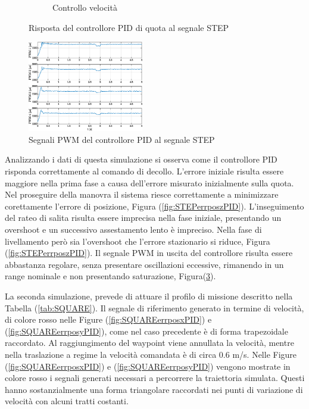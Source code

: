 \begin{figure}
\begin{subfigure}{0.45\textwidth}
		\caption{Controllo velocità}
		\label{fig:STEPerrvelzPID}
	\end{subfigure}
	\caption{Risposta del controllore PID di quota al segnale STEP}
\end{figure}

\begin{figure}
	\centering
	\includegraphics[width=0.45\textwidth]{Simulazioni/Figure/PID/STEP/PWM}
	\caption{Segnali PWM del controllore PID al segnale STEP}
	\label{fig:STEPerrPWMPID}
\end{figure}

Analizzando i dati di questa simulazione si osserva come il controllore PID risponda correttamente al comando di decollo. L'errore iniziale risulta essere maggiore nella prima fase a causa dell'errore misurato inizialmente sulla quota. Nel proseguire della manovra il sistema riesce correttamente a minimizzare corettamente l'errore di posizione, Figura (\ref{fig:STEPerrposzPID}). L'inseguimento del rateo di salita risulta essere imprecisa nella fase iniziale, presentando un overshoot e un successivo assestamento lento è impreciso. Nella fase di livellamento però sia l'overshoot che l'errore stazionario si riduce, Figura (\ref{fig:STEPerrposzPID}). Il segnale PWM in uscita del controllore risulta essere abbastanza regolare, senza presentare oscillazioni eccessive, rimanendo in un range nominale e non presentando saturazione, Figura(\ref{fig:STEPerrPWMPID}).

La seconda simulazione, prevede di attuare il profilo di missione descritto nella Tabella (\ref{tab:SQUARE}). Il segnale di riferimento generato in termine di velocità, di colore rosso nelle Figure (\ref{fig:SQUAREerrposxPID}) e (\ref{fig:SQUAREerrposyPID}), come nel caso precedente è di forma trapezoidale raccordato. Al raggiungimento del waypoint viene annullata la velocità, mentre nella traslazione a regime la velocità comandata è di circa  0.6 m/s. Nelle Figure (\ref{fig:SQUAREerrposxPID}) e (\ref{fig:SQUAREerrposyPID}) vengono mostrate in colore rosso i segnali generati necessari a percorrere la traiettoria simulata. Questi hanno sostanzialmente una forma triangolare raccordati nei punti di variazione di velocità con alcuni tratti costanti.

